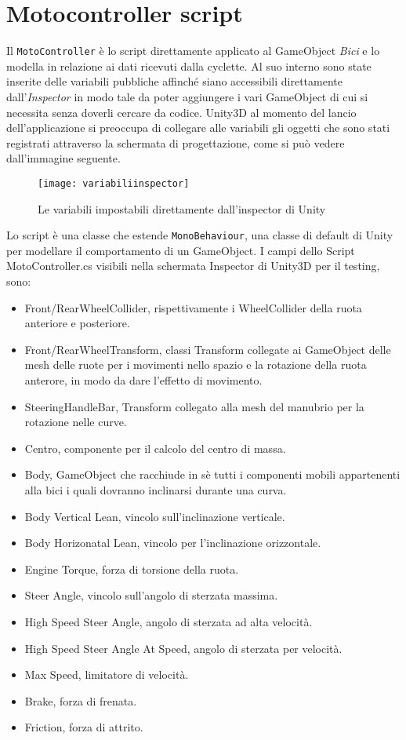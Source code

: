 \section{Motocontroller script}
Il \texttt{MotoController} è lo script direttamente applicato al GameObject \textit{Bici} e lo modella in relazione ai dati ricevuti dalla cyclette.
Al suo interno sono state inserite delle variabili pubbliche affinché siano accessibili direttamente dall’\textit{Inspector} in modo tale da poter aggiungere i vari GameObject di cui si necessita senza doverli cercare da codice. Unity3D al momento del lancio dell’applicazione si preoccupa di collegare alle variabili gli oggetti che sono stati registrati attraverso la schermata di progettazione, come si può vedere dall’immagine seguente.
 \begin{figure}[htb]
    \centering
    \texttt{[image: variabiliinspector]}
    \caption{Le variabili impostabili direttamente dall'inspector di Unity\label{fig:variabiliinspector}}
\end{figure}

\noindent Lo script è una classe che estende \texttt{MonoBehaviour}, una classe di default di Unity per modellare il comportamento di un GameObject. I campi dello Script MotoController.cs visibili nella schermata Inspector di Unity3D per il testing, sono:
\begin{itemize}
  \item Front/RearWheelCollider, rispettivamente i WheelCollider della ruota anteriore e posteriore.
  \item Front/RearWheelTransform, classi Transform collegate ai GameObject delle mesh delle ruote per i movimenti nello spazio e la rotazione della ruota anterore, in modo da dare l’effetto di movimento.
  \item SteeringHandleBar, Transform collegato alla mesh del manubrio per la rotazione nelle curve.
  \item Centro, componente per il calcolo del centro di massa.
  \item Body, GameObject che racchiude in sè tutti i componenti mobili appartenenti alla bici i quali dovranno inclinarsi durante una curva.
  \item Body Vertical Lean, vincolo sull’inclinazione verticale.
  \item Body Horizonatal Lean, vincolo per l’inclinazione orizzontale.
  \item Engine Torque, forza di torsione della ruota.
  \item Steer Angle, vincolo sull’angolo di sterzata massima.
  \item High Speed Steer Angle, angolo di sterzata ad alta velocità.
  \item High Speed Steer Angle At Speed, angolo di sterzata per velocità.
  \item Max Speed, limitatore di velocità.
  \item Brake, forza di frenata.
  \item Friction, forza di attrito.
\end{itemize}

